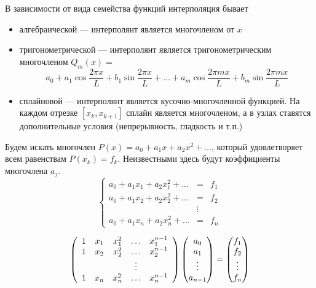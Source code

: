 \documentclass[professionalfonts,compress,unicode]{beamer}
\begin{document}
{
	В зависимости от вида семейства функций интерполяция бывает
	\begin{itemize}
		\item алгебраической --- интерполянт является многочленом от $x$
		\pause
		\item {тригонометрической --- интерполянт является тригонометрическим многочленом $Q_m(x) = $
		$$
			a_0 + a_1 \cos \frac{2\pi x}{L} + b_1 \sin \frac{2\pi x}{L} + \dots + a_m \cos \frac{2\pi mx}{L} + b_m \sin \frac{2\pi mx}{L}
		$$}
		\pause
		\item сплайновой --- интерполянт является кусочно-многочленной функцией. На каждом отрезке $[x_k, x_{k+1}]$ сплайн является многочленом, а
		в узлах ставятся дополнительные условия (непрерывность, гладкость и т.п.)
	\end{itemize}
}

{
	Будем искать многочлен $P(x) = a_0 + a_1 x + a_2 x^2 + \dots$, который удовлетворяет всем 
	равенствам $P(x_k) = f_k$. Неизвестными здесь будут коэффициенты многочлена $a_j$. 
	\pause
	\begin{equation*}
	\left\{
	\begin{array}{ccc}
	a_0 + a_1 x_1 + a_2 x_1^2 + \dots &=& f_1\\
	a_0 + a_1 x_2 + a_2 x_2^2 + \dots &=& f_2\\
	&\vdots&\\
	a_0 + a_1 x_n + a_2 x_n^2 + \dots &=& f_n
	\end{array}
	\right.
	\end{equation*}
	
	\pause
	\begin{equation*}
	\left(
	\begin{array}{ccccc}
		1&x_1&x_1^2& \dots & x_1^{n-1}\\
		1&x_2&x_2^2& \dots & x_2^{n-1}\\
		&&&\vdots\\
		1&x_n&x_n^2& \dots & x_n^{n-1}
	\end{array}
	\right)
	\left(
	\begin{array}{@{}c@{}}
		a_0\\
		a_1\\
		\vdots\\
		a_{n-1}
	\end{array}
	\right) = 
	\left(
	\begin{array}{@{}c@{}}
		f_1\\
		f_2\\
		\vdots\\
		f_n
	\end{array}
	\right)	
	\end{equation*}
}
\end{document}
